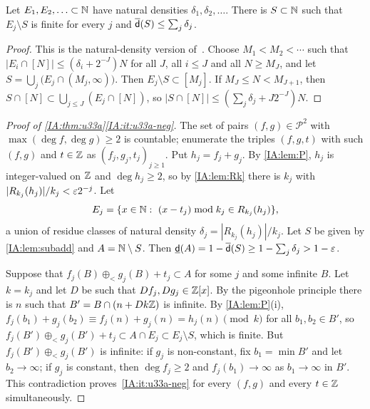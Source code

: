 \begin{lemma}\label{IA:lem:subadd}
Let $E_1,E_2,\ldots\subset\mathbb{N}$ have natural densities $\delta_1,\delta_2,\dots$. There is
$S\subset\mathbb{N}$ such that $E_j\setminus S$ is finite for every $j$ and $\overline{\mathsf{d}}(S)\le\sum_j\delta_j$.
\end{lemma}

\begin{proof}
This is the natural-density version of~\cite[Lemma~3.1]{ackelsberg2024counterexamples}. Choose
$M_1<M_2<\cdots$ such that $|E_i\cap[N]|\le(\delta_i+2^{-J})N$ for all $J$, all $i\le J$ and all
$N\ge M_J$, and let $S=\bigcup_j\big(E_j\cap(M_j,\infty)\big)$. Then $E_j\setminus S\subset[M_j]$.
If $M_J\le N<M_{J+1}$, then $S\cap[N]\subset\bigcup_{j\le J}(E_j\cap[N])$, so
$|S\cap[N]|\le(\sum_j\delta_j+J2^{-J})N$.
\end{proof}

\begin{proof}[Proof of \cref{IA:thm:u33a}\ref{IA:it:u33a-neg}]
The set of pairs $(f,g)\in\mathcal P^2$ with $\max(\deg f,\deg g)\ge2$ is countable; enumerate the
triples $(f,g,t)$ with such $(f,g)$ and $t\in\mathbb{Z}$ as $(f_j,g_j,t_j)_{j\ge1}$. Put $h_j=f_j+g_j$. By
\cref{IA:lem:P}, $h_j$ is integer-valued on $\mathbb{Z}$ and $\deg h_j\ge2$, so by \cref{IA:lem:Rk} there is
$k_j$ with $|R_{k_j}(h_j)|/k_j<\varepsilon2^{-j}$. Let
\[
E_j=\{x\in\mathbb{N}:\ (x-t_j)\bmod k_j\in R_{k_j}(h_j)\},
\]
a union of residue classes of natural density $\delta_j=|R_{k_j}(h_j)|/k_j$. Let $S$ be given by
\cref{IA:lem:subadd} and $A=\mathbb{N}\setminus S$. Then $\underline{\mathsf{d}}(A)=1-\overline{\mathsf{d}}(S)\ge1-\sum_j\delta_j>1-\varepsilon$.

Suppose that $f_j(B)\oplus_<g_j(B)+t_j\subset A$ for some $j$ and some infinite $B$. Let $k=k_j$ and
let $D$ be such that $Df_j,Dg_j\in\mathbb{Z}[x]$. By the pigeonhole principle there is $n$ such that
$B'=B\cap(n+Dk\mathbb{Z})$ is infinite. By \cref{IA:lem:P}(i), $f_j(b_1)+g_j(b_2)\equiv f_j(n)+g_j(n)=h_j(n)
\pmod k$ for all $b_1,b_2\in B'$, so $f_j(B')\oplus_<g_j(B')+t_j\subset A\cap E_j\subset E_j\setminus
S$, which is finite. But $f_j(B')\oplus_<g_j(B')$ is infinite: if $g_j$ is non-constant, fix
$b_1=\min B'$ and let $b_2\to\infty$; if $g_j$ is constant, then $\deg f_j\ge2$ and $f_j(b_1)\to\infty$
as $b_1\to\infty$ in $B'$. This contradiction proves~\ref{IA:it:u33a-neg} for every $(f,g)$ and every
$t\in\mathbb{Z}$ simultaneously.
\end{proof}

